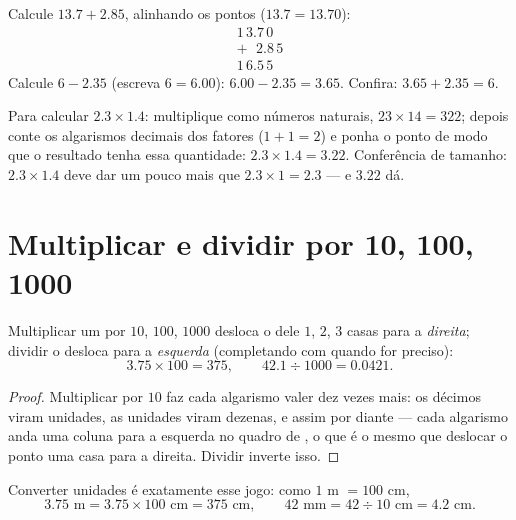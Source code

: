 \begin{example}\label{ex:g6:decimals:addsub}
Calcule $13.7 + 2.85$, alinhando os pontos ($13.7 = 13.70$):
\[
\begin{array}{r}
1\,3.7\,0 \\
+\ \ \,2.8\,5 \\
\hline
1\,6.5\,5
\end{array}
\]
Calcule $6 - 2.35$ (escreva $6 = 6.00$): $6.00 - 2.35 = 3.65$.
Confira: $3.65 + 2.35 = 6$.
\end{example}

\begin{example}\label{ex:g6:decimals:mult}
Para calcular $2.3 \times 1.4$: multiplique como números naturais,
$23 \times 14 = 322$; depois conte os algarismos decimais dos fatores
($1 + 1 = 2$) e ponha o ponto de modo que o resultado tenha essa
quantidade: $2.3 \times 1.4 = 3.22$. Conferência de tamanho:
$2.3 \times 1.4$ deve dar um pouco mais que $2.3 \times 1 = 2.3$ --- e
$3.22$ dá.
\end{example}

\section{Multiplicar e dividir por 10, 100, 1000}

\begin{proposition}\label{prop:g6:decimals:shift}
Multiplicar um  por $10$, $100$, $1000$ desloca o  dele $1$, $2$, $3$ casas para a \emph{direita}; dividir o
desloca para a \emph{esquerda} (completando com  quando for
preciso):
\[
3.75 \times 100 = 375, \qquad
42.1 \div 1000 = 0.0421 .
\]
\end{proposition}

\begin{proof}
Multiplicar por $10$ faz cada algarismo valer dez vezes mais: os
décimos viram unidades, as unidades viram dezenas, e assim por diante
--- cada algarismo anda uma coluna para a esquerda no quadro de , o que é o mesmo que deslocar o ponto uma casa para a
direita. Dividir inverte isso.
\end{proof}

\begin{example}\label{ex:g6:decimals:units}
Converter unidades é exatamente esse jogo: como $1$ m $= 100$ cm,
\[
3.75 \text{ m} = 3.75 \times 100 \text{ cm} = 375 \text{ cm},
\qquad
42 \text{ mm} = 42 \div 10 \text{ cm} = 4.2 \text{ cm}.
\]
\end{example}

